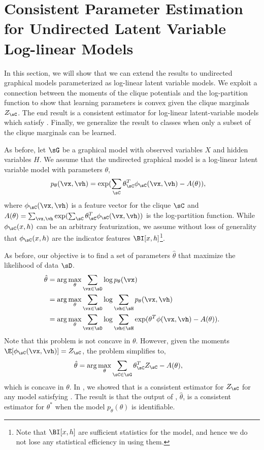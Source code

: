 \section{Consistent Parameter Estimation for Undirected Latent Variable Log-linear Models}
\label{sec:undirected}

In this section, we will show that we can extend the results to
  undirected graphical models parameterized as log-linear latent variable
  models.
We exploit a connection between the moments of the clique potentials and
  the log-partition function to show that learning parameters is convex
  given the clique marginals $Z_\sC$. 
The end result is a consistent estimator for log-linear
  latent-variable models which satisfy .
Finally, we generalize the result to classes when only a subset of the
  clique marginals can be learned.

As before, let $\sG$ be a graphical model with observed variables $X$ and hidden variables $H$.
We assume that the undirected graphical model is a log-linear latent
  variable model with parameters $\theta$,
\begin{align*}
  p_\theta(\vx, \vh) &= \exp( \sum_\sC \theta_\sC^T \phi_\sC(\vx,\vh) - A(\theta) ),
\end{align*}
where $\phi_\sC(\vx,\vh)$ is a feature vector for the clique $\sC$ and
  $A(\theta) = \sum_{\vx, \vh}  \exp( \sum_\sC \theta_\sC^T \phi_\sC(\vx,\vh) )$ is the
  log-partition function.
While $\phi_\sC(x,h)$ can be an arbitrary featurization, we assume
  without loss of generality that $\phi_\sC(x,h)$ are the indicator
  features $\BI[x,h]$\footnote{Note that $\BI[x,h]$ are sufficient
  statistics for the model, and hence we do not lose any statistical
  efficiency in using them.}.

As before, our objective is to find a set of parameters $\hat \theta$
  that maximize the likelihood of data $\sD$.
\begin{align}
  \hat \theta 
      &= \arg\max_{\theta} \sum_{\vx \in \sD} \log p_\theta(\vx) \nonumber \\
      &= \arg\max_{\theta} \sum_{\vx \in \sD} \log \sum_{\vh \in \sH} p_\theta(\vx,\vh) \nonumber \\
      &= \arg\max_{\theta} \sum_{\vx \in \sD} \log \sum_{\vh \in \sH} \exp( \theta^T\phi(\vx,\vh) - A(\theta) ). \label{eqn:obj-ml}
\end{align}
Note that this problem is not concave in $\theta$. 
However, given the moments $\E[ \phi_\sC(\vx,\vh) ] = Z_\sC$, the
  problem simplifies to,
\begin{align}
  \hat \theta 
  &= \arg\max_{\theta} \sum_{\sC \in \sG} \theta_\sC^T Z_\sC - A(\theta), \label{eqn:obj}
\end{align}
which is concave in $\theta$.
In , we showed that \LearnMarginals is a consistent
  estimator for $Z_\sC$ for any model satisfying . 
The result is that the output of , $\hat\theta$, is a consistent estimator for $\theta^*$
  when the model $p_\theta(\theta)$ is identifiable.

